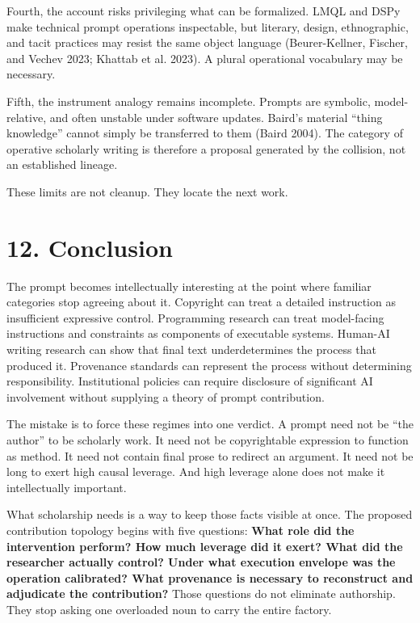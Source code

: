 \documentclass[
]{article}
\begin{document}
Fourth, the account risks privileging what can be formalized. LMQL and
DSPy make technical prompt operations inspectable, but literary, design,
ethnographic, and tacit practices may resist the same object language
(Beurer-Kellner, Fischer, and Vechev 2023; Khattab et al. 2023). A
plural operational vocabulary may be necessary.

Fifth, the instrument analogy remains incomplete. Prompts are symbolic,
model-relative, and often unstable under software updates. Baird's
material ``thing knowledge'' cannot simply be transferred to them (Baird
2004). The category of operative scholarly writing is therefore a
proposal generated by the collision, not an established lineage.

These limits are not cleanup. They locate the next work.

\section{12. Conclusion}\label{conclusion}

The prompt becomes intellectually interesting at the point where
familiar categories stop agreeing about it. Copyright can treat a
detailed instruction as insufficient expressive control. Programming
research can treat model-facing instructions and constraints as
components of executable systems. Human-AI writing research can show
that final text underdetermines the process that produced it. Provenance
standards can represent the process without determining responsibility.
Institutional policies can require disclosure of significant AI
involvement without supplying a theory of prompt contribution.

The mistake is to force these regimes into one verdict. A prompt need
not be ``the author'' to be scholarly work. It need not be copyrightable
expression to function as method. It need not contain final prose to
redirect an argument. It need not be long to exert high causal leverage.
And high leverage alone does not make it intellectually important.

What scholarship needs is a way to keep those facts visible at once. The
proposed contribution topology begins with five questions: \textbf{What
role did the intervention perform? How much leverage did it exert? What
did the researcher actually control? Under what execution envelope was
the operation calibrated? What provenance is necessary to reconstruct
and adjudicate the contribution?} Those questions do not eliminate
authorship. They stop asking one overloaded noun to carry the entire
factory.
\end{document}
